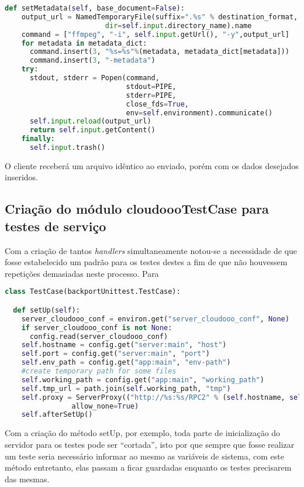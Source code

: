 {\singlespace
\begin{lstlisting}[caption=setMetadata do FFMPEGHandler,language=python,label={setmet}]
  def setMetadata(self, base_document=False):
    output_url = NamedTemporaryFile(suffix=".%s" % destination_format,
                        dir=self.input.directory_name).name
    command = ["ffmpeg", "-i", self.input.getUrl(), "-y",output_url]
    for metadata in metadata_dict:
      command.insert(3, "%s=%s"%(metadata, metadata_dict[metadata]))
      command.insert(3, "-metadata")
    try:
      stdout, stderr = Popen(command,
                             stdout=PIPE,
                             stderr=PIPE,
                             close_fds=True,
                             env=self.environment).communicate()
      self.input.reload(output_url)
      return self.input.getContent()
    finally:
      self.input.trash()
\end{lstlisting}
}

O cliente receberá um arquivo idêntico ao enviado, porém com os dados desejados inseridos.

\subsection{Criação do módulo cloudoooTestCase para testes de serviço}

Com a criação de tantos \textit{handlers} simultaneamente notou-se a necessidade de que fosse estabelecido um padrão para os testes destes a fim de que não houvessem repetições demasiadas neste processo.
Para 

{\singlespace
\begin{lstlisting}[caption=setUp do cloudoooTestCase,language=python,label={setup}]
class TestCase(backportUnittest.TestCase):

  def setUp(self):
    server_cloudooo_conf = environ.get("server_cloudooo_conf", None)
    if server_cloudooo_conf is not None:
      config.read(server_cloudooo_conf)
    self.hostname = config.get("server:main", "host")
    self.port = config.get("server:main", "port")
    self.env_path = config.get("app:main", "env-path")
    #create temporary path for some files
    self.working_path = config.get("app:main", "working_path")
    self.tmp_url = path.join(self.working_path, "tmp")
    self.proxy = ServerProxy(("http://%s:%s/RPC2" % (self.hostname, self.port)),\
                allow_none=True)
    self.afterSetUp()
\end{lstlisting}
}

Com a criação do método setUp, por exemplo, toda parte de inicialização do servidor para os testes pode ser ``cortada'', isto por que sempre que fosse realizar um teste seria necessário informar ao mesmo as variáveis de sistema, com este método entretanto, elas passam a ficar guardadas enquanto os testes precisarem das mesmas.

